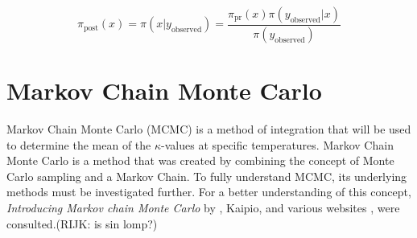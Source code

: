 	\begin{equation}
	\label{bayes_eq}
	\pi_{\text{post}}(x) = \pi(x|y_{\text{observed}}) = \frac{\pi_{\text{pr}}(x) \pi(y_{\text{observed}}|x)}{\pi (y_{\text{observed}})}	
	\end{equation}
	
	

\section{Markov Chain Monte Carlo} \label{MCMCdet}
Markov Chain Monte Carlo (MCMC) is a method of integration that will be used to determine the mean of the $\kappa$-values at specific temperatures. 
	Markov Chain Monte Carlo is a method that was created by combining the concept of Monte Carlo sampling  and a Markov Chain. 
	To fully understand MCMC, its underlying methods must be investigated further.
	For a better understanding of this concept, \textit{Introducing Markov chain Monte Carlo} by \citeauthor{Gilks:1996}, Kaipio, and various websites \citep{MLM:2019}, \citep{dummies:2015} were consulted.(RIJK: is sin lomp?)
